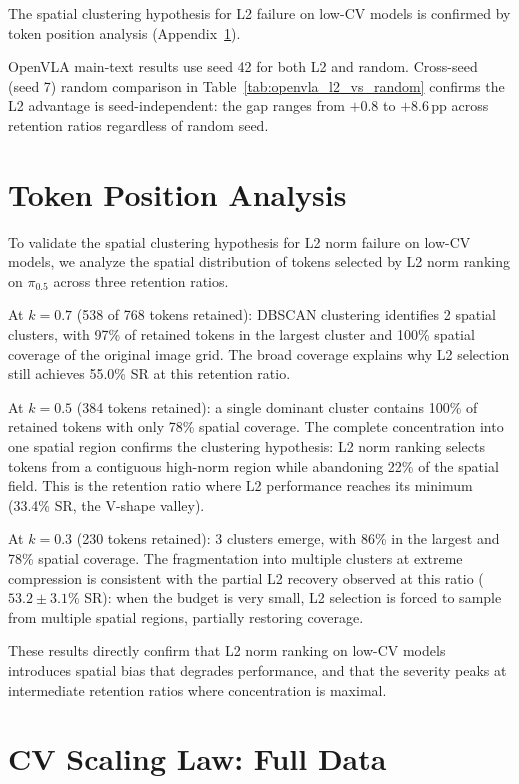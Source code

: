 The spatial clustering hypothesis for L2 failure on low-CV models is confirmed by token position analysis (Appendix~\ref{app:token_position}).

OpenVLA main-text results use seed 42 for both L2 and random. Cross-seed (seed 7) random comparison in Table~\ref{tab:openvla_l2_vs_random} confirms the L2 advantage is seed-independent: the gap ranges from $+$0.8 to $+$8.6\,pp across retention ratios regardless of random seed.


\section{Token Position Analysis}
\label{app:token_position}

To validate the spatial clustering hypothesis for L2 norm failure on low-CV models, we analyze the spatial distribution of tokens selected by L2 norm ranking on $\pi_{0.5}$ across three retention ratios.

At $k{=}0.7$ (538 of 768 tokens retained): DBSCAN clustering identifies 2 spatial clusters, with 97\% of retained tokens in the largest cluster and 100\% spatial coverage of the original image grid. The broad coverage explains why L2 selection still achieves 55.0\% SR at this retention ratio.

At $k{=}0.5$ (384 tokens retained): a single dominant cluster contains 100\% of retained tokens with only 78\% spatial coverage. The complete concentration into one spatial region confirms the clustering hypothesis: L2 norm ranking selects tokens from a contiguous high-norm region while abandoning 22\% of the spatial field. This is the retention ratio where L2 performance reaches its minimum (33.4\% SR, the V-shape valley).

At $k{=}0.3$ (230 tokens retained): 3 clusters emerge, with 86\% in the largest and 78\% spatial coverage. The fragmentation into multiple clusters at extreme compression is consistent with the partial L2 recovery observed at this ratio ($53.2 \pm 3.1$\% SR): when the budget is very small, L2 selection is forced to sample from multiple spatial regions, partially restoring coverage.

These results directly confirm that L2 norm ranking on low-CV models introduces spatial bias that degrades performance, and that the severity peaks at intermediate retention ratios where concentration is maximal.


\section{CV Scaling Law: Full Data}
\label{app:cv_scaling_table}

